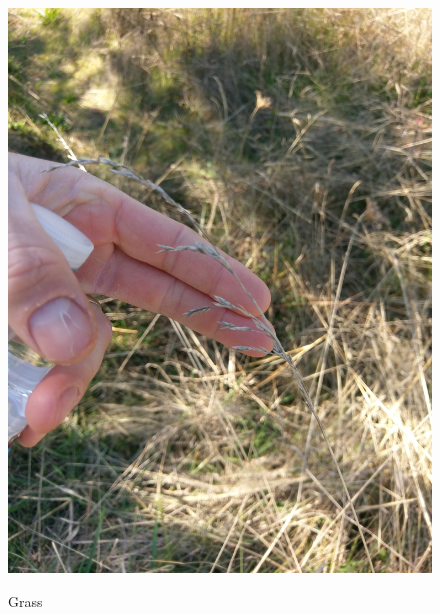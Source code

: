 \documentclass{article}
\begin{document}
\begin{figure}[H]
\centering{}
\caption{Grass}
\includegraphics[scale=0.06]{thin_grass_inflorecense_closeup.jpg}
\label{}
\end{figure}
\end{document}
